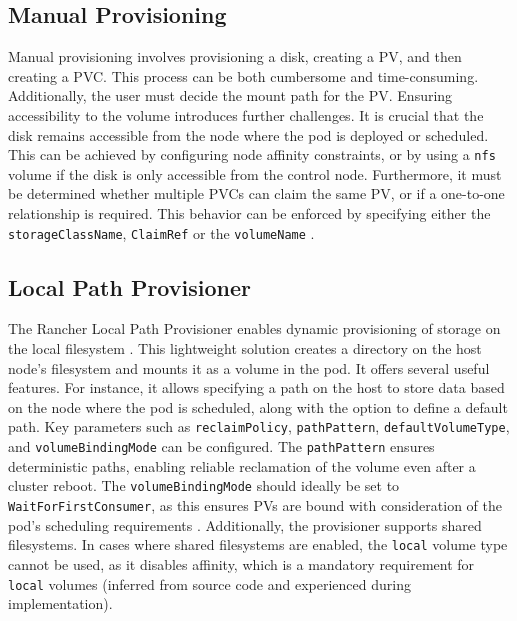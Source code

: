 \subsection{Manual Provisioning} 

Manual provisioning involves provisioning a disk, creating a PV, and then creating a PVC. This process can be both cumbersome and time-consuming. Additionally, the user must decide the mount path for the PV. Ensuring accessibility to the volume introduces further challenges. It is crucial that the disk remains accessible from the node where the pod is deployed or scheduled. This can be achieved by configuring node affinity constraints, or by using a \texttt{nfs} volume if the disk is only accessible from the control node. Furthermore, it must be determined whether multiple PVCs can claim the same PV, or if a one-to-one relationship is required. This behavior can be enforced by specifying either the \texttt{storageClassName}, \texttt{ClaimRef} or the \texttt{volumeName} \Parencite{kubernetesPersistentVolumes}.

\subsection{Local Path Provisioner} 

The Rancher Local Path Provisioner enables dynamic provisioning of storage on the local filesystem \Parencite{rancher_local_path_provisioner}. This lightweight solution creates a directory on the host node's filesystem and mounts it as a volume in the pod. It offers several useful features. For instance, it allows specifying a path on the host to store data based on the node where the pod is scheduled, along with the option to define a default path. Key parameters such as \texttt{reclaimPolicy}, \texttt{pathPattern}, \texttt{defaultVolumeType}, and \texttt{volumeBindingMode} can be configured. The \texttt{pathPattern} ensures deterministic paths, enabling reliable reclamation of the volume even after a cluster reboot. The \texttt{volumeBindingMode} should ideally be set to \texttt{WaitForFirstConsumer}, as this ensures PVs are bound with consideration of the pod's scheduling requirements \Parencite{kubernetes_storage_classes}. Additionally, the provisioner supports shared filesystems. In cases where shared filesystems are enabled, the \texttt{local} volume type cannot be used, as it disables affinity, which is a mandatory requirement for \texttt{local} volumes (inferred from source code and experienced during implementation).

